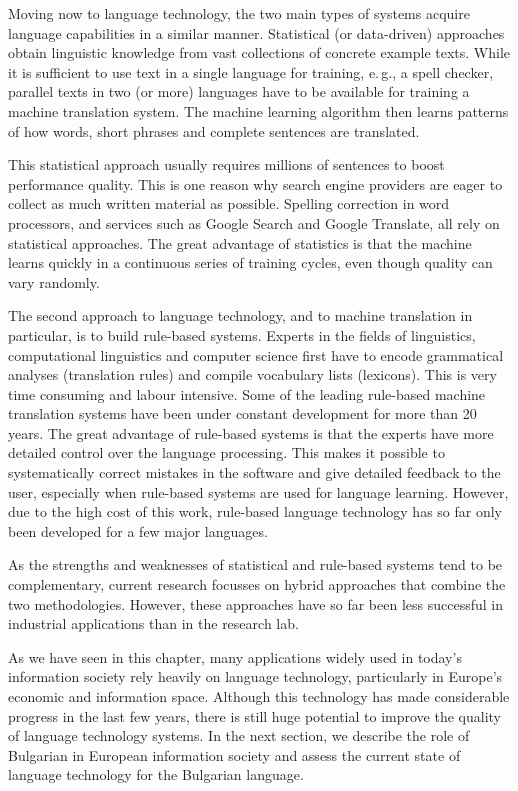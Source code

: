 \documentclass[]{../../metanetpaper}
\begin{document}
\begin{multicols}{2}
Moving now to language technology, the two main types of systems acquire language capabilities in a similar manner. Statistical (or data-driven) approaches obtain linguistic knowledge from vast collections of concrete example texts. While it is sufficient to use text in a single language for training, e.\,g., a spell checker, parallel texts in two (or more) languages have to be available for training a machine translation system. The machine learning algorithm then learns patterns of how words, short phrases and complete sentences are translated. 

This statistical approach usually requires millions of sentences to boost performance quality. This is one reason why search engine providers are eager to collect as much written material as possible. Spelling correction in word processors, and services such as Google Search and Google Translate, all rely on statistical approaches. The great advantage of statistics is that the machine learns quickly in a continuous series of training cycles, even though quality can vary randomly.

The second approach to language technology, and to machine translation in particular, is to build rule-based systems. Experts in the fields of linguistics, computational linguistics and computer science first have to encode grammatical analyses (translation rules) and compile vocabulary lists (lexicons). This is very time consuming and labour intensive. Some of the leading rule-based machine translation systems have been under constant development for more than 20 years. The great advantage of rule-based systems is that the experts have more detailed control over the language processing. This makes it possible to systematically correct mistakes in the software and give detailed feedback to the user, especially when rule-based systems are used for language learning. However, due to the high cost of this work, rule-based language technology has so far only been developed for a few major languages. 


As the strengths and weaknesses of statistical and rule-based systems tend to be complementary, current research focusses on hybrid approaches that combine the two methodologies. However, these approaches have so far been less successful in industrial applications than in the research lab. 

As we have seen in this chapter, many applications widely used in today’s information society rely heavily on language technology, particularly in Europe’s economic and information space. Although this technology has made considerable progress in the last few years, there is still huge potential to improve the quality of language technology systems. In the next section, we describe the role of Bulgarian in European information society and assess the current state of language technology for the Bulgarian language.
\end{multicols}
\end{document}
